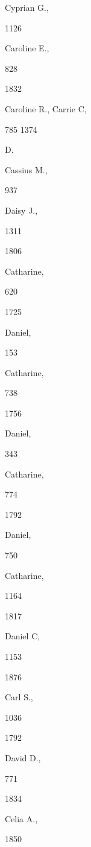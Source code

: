 Cyprian G., 


1126 




Caroline E., 


828 








1832 


Caroline R., 
Carrie C, 


785 
1374 




D. 






Cassius M., 


937 




Daisy J., 


1311 


1806 


Catharine, 


620 


1725 


Daniel, 


153 




Catharine, 


738 


1756 


Daniel, 


343 




Catharine, 


774 


1792 


Daniel, 


750 




Catharine, 


1164 


1817 


Daniel C, 


1153 


1876 


Carl S., 


1036 


1792 


David D., 


771 


1834 


Celia A., 


1850 




